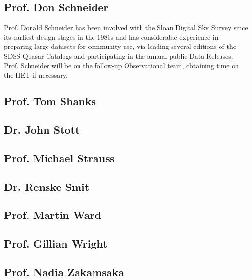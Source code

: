 \subsection{Prof. Don Schneider}
Prof. Donald Schneider has been involved with the Sloan Digital Sky
Survey since its earliest design stages in the 1980s and has
considerable experience in preparing large datasets for community use,
via leading several editions of the SDSS Quasar Catalogs and
participating in the annual public Data Releases. Prof. Schneider will
be on the follow-up Observational team, obtaining time on the HET if
necessary.


\subsection{Prof. Tom Shanks}	


\subsection{Dr. John Stott}


\subsection{Prof. Michael  Strauss}


\subsection{Dr. Renske Smit}		


\subsection{Prof. Martin Ward}		


\subsection{Prof. Gillian Wright}


\subsection{Prof. Nadia Zakamsaka} 